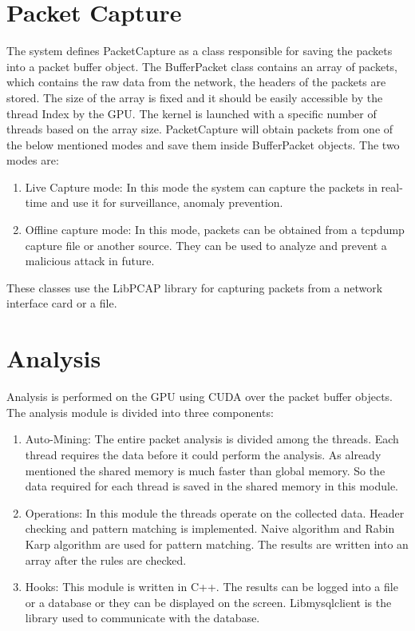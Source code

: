 \section{Packet Capture}
The system defines PacketCapture as a class responsible for saving the packets into a packet buffer object. The BufferPacket class contains an array of packets, which contains the raw data from the network, the headers of the packets are stored. The size of the array is fixed and it should be easily accessible by the thread Index by the GPU. The kernel is launched with a specific number of threads based on the array size.
PacketCapture will obtain packets from one of the below mentioned modes and save them inside BufferPacket objects.
The two modes are:
\begin{enumerate}
	\item Live Capture mode: In this mode the system can capture the packets in real-time and use it for surveillance, anomaly prevention.
	\item Offline capture mode: In this mode, packets can be obtained from a tcpdump capture file or another source. They can be used to analyze and prevent a malicious attack in future.
\end{enumerate}
These classes use the LibPCAP library for capturing packets from a network interface card or a file. 

\section{Analysis}

Analysis is performed on the GPU using CUDA over the packet buffer objects.
The analysis module is divided into three components:
\begin{enumerate}
\item Auto-Mining: The entire packet analysis is divided among the threads. Each thread requires the data before it could perform the analysis. As already mentioned the shared memory is much faster than global memory. So the data required for each thread is saved in the shared memory in this module.
\item Operations: In this module the threads operate on the collected data. Header checking and pattern matching is implemented. Naive algorithm and Rabin Karp algorithm are used for pattern matching. The results are written into an array after the rules are checked.
\item Hooks: This module is written in C++. The results can be logged into a file or a database or they can be displayed on the screen. Libmysqlclient is the library used to communicate with the database.	
\end{enumerate}

